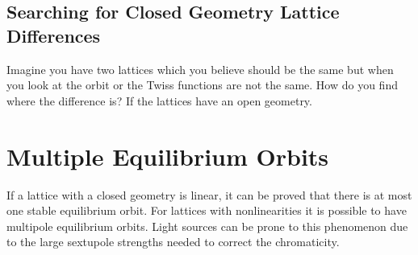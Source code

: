 \documentclass{hitec}     %
\newcommand{\Section}[1]{\section{#1}\vspace*{-1ex}}
\begin{document}
\subsection{Searching for Closed Geometry Lattice Differences}
\label{s:closed.diff}

Imagine you have two lattices which you believe should be the same but when you look at the orbit or
the Twiss functions are not the same. How do you find where the difference is? If the lattices have an
open geometry.

\Section{Multiple Equilibrium Orbits}
\label{s:mult.eq}

If a lattice with a closed geometry is linear, it can be proved that there is at most one stable
equilibrium orbit. For lattices with nonlinearities it is possible to have multipole equilibrium
orbits. Light sources can be prone to this phenomenon due to the large sextupole strengths needed 
to correct the chromaticity. 
\end{document}
